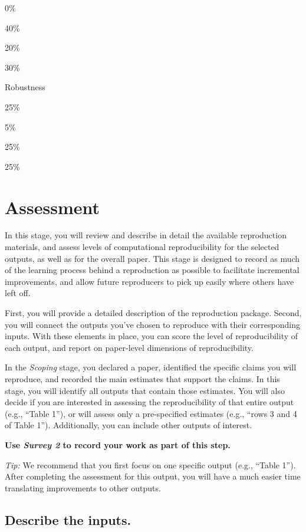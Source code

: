 \documentclass[]{book}
\begin{document}
0\%

40\%

20\%

30\%

Robustness

25\%

5\%

25\%

25\%

\hypertarget{assessment}{%
\chapter{Assessment}\label{assessment}}

In this stage, you will review and describe in detail the available reproduction materials, and assess levels of computational reproducibility for the selected outputs, as well as for the overall paper. This stage is designed to record as much of the learning process behind a reproduction as possible to facilitate incremental improvements, and allow future reproducers to pick up easily where others have left off.

First, you will provide a detailed description of the reproduction package. Second, you will connect the outputs you've chosen to reproduce with their corresponding inputs. With these elements in place, you can score the level of reproducibility of each output, and report on paper-level dimensions of reproducibility.

In the \emph{Scoping} stage, you declared a paper, identified the specific claims you will reproduce, and recorded the main estimates that support the claims. In this stage, you will identify all outputs that contain those estimates. You will also decide if you are interested in assessing the reproducibility of that entire output (e.g., ``Table 1''), or will assess only a pre-specified estimates (e.g., ``rows 3 and 4 of Table 1''). Additionally, you can include other outputs of interest.

\textbf{Use \emph{Survey 2} to record your work as part of this step.}

\emph{Tip:} We recommend that you first focus on one specific output (e.g., ``Table 1''). After completing the assessment for this output, you will have a much easier time translating improvements to other outputs.

\hypertarget{describe-inputs}{%
\section{Describe the inputs.}\label{describe-inputs}}
\end{document}
